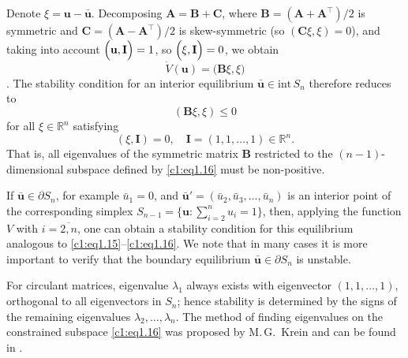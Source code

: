 \documentclass[12pt]{report}
\newcommand{\R}{\mathbb{R}}
\newcommand{\inside}{\mathrm{int}\,}
\theoremstyle{definition}
\theoremstyle{remark}
\begin{document}
Denote $\xi=\mathbf{u}-\bar{\mathbf{u}}$. Decomposing
$\mathbf{A}=\mathbf{B}+\mathbf{C}$, where
$\mathbf{B}=(\mathbf{A}+\mathbf{A}^{\top})/2$ is symmetric and
$\mathbf{C}=(\mathbf{A}-\mathbf{A}^{\top})/2$ is skew-symmetric
(so $(\mathbf{C}\xi,\xi)=0$), and taking into account  $\Big({\bf u, I}\Big) = 1$, so $\Big(\xi, {\bf I}\Big) = 0$, we obtain
\[\dot{V}(\mathbf{u})=\Big(\mathbf{B}\xi,\xi\Big)\].
The stability condition for an interior equilibrium
$\bar{\mathbf{u}}\in\inside S_{n}$ therefore reduces to
\begin{equation}
  (\mathbf{B}\xi,\xi)\leqslant 0
  \label{c1:eq1.15}
\end{equation}
for all $\xi\in\R^{n}$ satisfying
\begin{equation}
  (\xi,\mathbf{I})=0,\quad \mathbf{I}=(1,1,\ldots,1)\in\R^{n}.
  \label{c1:eq1.16}
\end{equation}
That is, all eigenvalues of the symmetric matrix $\mathbf{B}$
restricted to the $(n-1)$-dimensional subspace defined by
\eqref{c1:eq1.16} must be non-positive.

If $\bar{\mathbf{u}}\in\partial S_{n}$, for example $\bar{u}_{1}=0$,
and $\bar{\mathbf{u}}'=(\bar{u}_{2},\bar{u}_{3},\ldots,\bar{u}_{n})$
is an interior point of the corresponding simplex
$S_{n-1}=\bigl\{\mathbf{u}: \sum_{i=2}^{n}u_{i}=1\bigr\}$,
then, applying the function $V$ with $i=\overline{2,n}$, one can obtain
a stability condition for this equilibrium analogous to
\eqref{c1:eq1.15}--\eqref{c1:eq1.16}.
We note that in many cases it is more important to verify that the
boundary equilibrium $\bar{\mathbf{u}}\in\partial S_{n}$ is unstable.

For circulant matrices, eigenvalue $\lambda_{1}$ always exists with
eigenvector $(1,1,\ldots,1)$, orthogonal to all eigenvectors in $S_{n}$;
hence stability is determined by the signs of the remaining eigenvalues
$\lambda_{2},\ldots,\lambda_{n}$.  The method of finding eigenvalues on
the constrained subspace \eqref{c1:eq1.16} was proposed by
M.\,G.~Krein and can be found in \cite{c1:Shilov1969}. 
\end{document}

